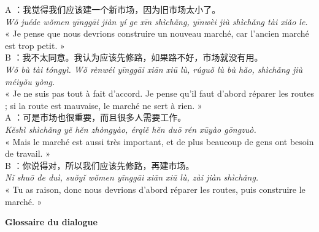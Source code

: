 \documentclass[11pt]{article}
\begin{document}
\begin{textebox}
A ：我觉得我们应该建一个新市场，因为旧市场太小了。\\
\emph{Wǒ juéde wǒmen yīnggāi jiàn yí ge xīn shìchǎng, yīnwèi jiù shìchǎng tài xiǎo le.}\\
« Je pense que nous devrions construire un nouveau marché, car l'ancien marché est trop petit. »\\[4pt]
B ：我不太同意。我认为应该先修路，如果路不好，市场就没有用。\\
\emph{Wǒ bù tài tóngyì. Wǒ rènwéi yīnggāi xiān xiū lù, rúguǒ lù bù hǎo, shìchǎng jiù méiyǒu yòng.}\\
« Je ne suis pas tout à fait d'accord. Je pense qu'il faut d'abord réparer les routes ; si la route est mauvaise, le marché ne sert à rien. »\\[4pt]
A ：可是市场也很重要，而且很多人需要工作。\\
\emph{Kěshì shìchǎng yě hěn zhòngyào, érqiě hěn duō rén xūyào gōngzuò.}\\
« Mais le marché est aussi très important, et de plus beaucoup de gens ont besoin de travail. »\\[4pt]
B ：你说得对，所以我们应该先修路，再建市场。\\
\emph{Nǐ shuō de duì, suǒyǐ wǒmen yīnggāi xiān xiū lù, zài jiàn shìchǎng.}\\
« Tu as raison, donc nous devrions d'abord réparer les routes, puis construire le marché. »
\end{textebox}

\textbf{Glossaire du dialogue}
\end{document}
